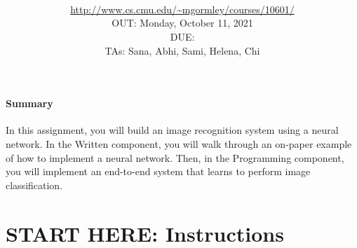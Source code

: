 \documentclass[11pt,addpoints,answers]{exam}
\title{\textsc{\hwName}
} %
\author{\courseName\\
\url{http://www.cs.cmu.edu/~mgormley/courses/10601/} \\
OUT: Monday, October 11, 2021 \\
DUE: \dueDate{} \\ 
TAs: Sana, Abhi, Sami, Helena, Chi
}
\date{}
\date{}
\begin{document}
\maketitle

\begin{notebox}
\paragraph{Summary} In this assignment, you will build an image recognition system using a neural network. In the Written component, you will walk through an on-paper example of how to implement a neural network. Then, in the Programming component, you will implement an end-to-end system that learns to perform image classification.
\end{notebox}
\section*{START HERE: Instructions}
\end{document}
